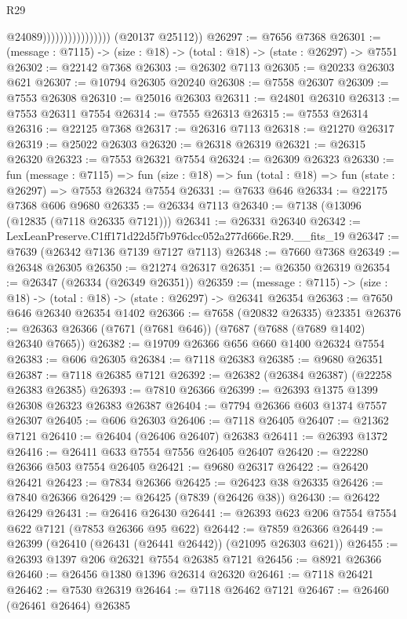 \begin{lexlean}{R29}
\begin{coremodule}
                                      @24089))))))))))))))))
      (@20137 @25112))
@26297 := @7656 @7368
@26301 := (message : @7115) -> (size : @18) -> (total : @18) -> (state : @26297) -> @7551
@26302 := @22142 @7368
@26303 := @26302 @7113
@26305 := @20233 @26303 @621
@26307 := @10794 @26305 @20240
@26308 := @7558 @26307
@26309 := @7553 @26308
@26310 := @25016 @26303
@26311 := @24801 @26310
@26313 := @7553 @26311 @7554
@26314 := @7555 @26313
@26315 := @7553 @26314
@26316 := @22125 @7368
@26317 := @26316 @7113
@26318 := @21270 @26317
@26319 := @25022 @26303
@26320 := @26318 @26319
@26321 := @26315 @26320
@26323 := @7553 @26321 @7554
@26324 := @26309 @26323
@26330 := fun (message : @7115) =>
  fun (size : @18) => fun (total : @18) => fun (state : @26297) => @7553 @26324 @7554
@26331 := @7633 @646
@26334 := @22175 @7368 @606 @9680
@26335 := @26334 @7113
@26340 := @7138 (@13096 (@12835 (@7118 @26335 @7121)))
@26341 := @26331 @26340
@26342 := LexLeanPreserve.C1ff171d22d5f7b976dcc052a277d666e.R29.__fits_19
@26347 := @7639 (@26342 @7136 @7139 @7127 @7113)
@26348 := @7660 @7368
@26349 := @26348 @26305
@26350 := @21274 @26317
@26351 := @26350 @26319
@26354 := @26347 (@26334 (@26349 @26351))
@26359 := (message : @7115) -> (size : @18) -> (total : @18) -> (state : @26297) -> @26341 @26354
@26363 := @7650 @646 @26340 @26354 @1402
@26366 := @7658 (@20832 @26335) @23351
@26376 := @26363 @26366 (@7671 (@7681 @646)) (@7687 (@7688 (@7689 @1402) @26340 @7665))
@26382 := @19709 @26366 @656 @660 @1400 @26324 @7554
@26383 := @606 @26305
@26384 := @7118 @26383
@26385 := @9680 @26351
@26387 := @7118 @26385 @7121
@26392 := @26382 (@26384 @26387) (@22258 @26383 @26385)
@26393 := @7810 @26366
@26399 := @26393 @1375 @1399 @26308 @26323 @26383 @26387
@26404 := @7794 @26366 @603 @1374 @7557 @26307
@26405 := @606 @26303
@26406 := @7118 @26405
@26407 := @21362 @7121
@26410 := @26404 (@26406 @26407) @26383
@26411 := @26393 @1372
@26416 := @26411 @633 @7554 @7556 @26405 @26407
@26420 := @22280 @26366 @503 @7554 @26405
@26421 := @9680 @26317
@26422 := @26420 @26421
@26423 := @7834 @26366
@26425 := @26423 @38 @26335
@26426 := @7840 @26366
@26429 := @26425 (@7839 (@26426 @38))
@26430 := @26422 @26429
@26431 := @26416 @26430
@26441 := @26393 @623 @206 @7554 @7554 @622 @7121 (@7853 @26366 @95 @622)
@26442 := @7859 @26366
@26449 := @26399 (@26410 (@26431 (@26441 @26442)) (@21095 @26303 @621))
@26455 := @26393 @1397 @206 @26321 @7554 @26385 @7121
@26456 := @8921 @26366
@26460 := @26456 @1380 @1396 @26314 @26320
@26461 := @7118 @26421
@26462 := @7530 @26319
@26464 := @7118 @26462 @7121
@26467 := @26460 (@26461 @26464) @26385

\end{coremodule}
\end{lexlean}
